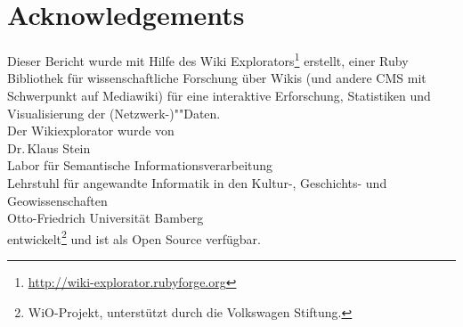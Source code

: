 \documentclass{scrartcl}
\begin{document}
\section*{Acknowledgements}
Dieser Bericht wurde mit Hilfe des Wiki Explorators\footnote{\protect\url{http://wiki-explorator.rubyforge.org}} erstellt, einer Ruby Bibliothek für wissenschaftliche Forschung über Wikis (und andere CMS mit Schwerpunkt auf Mediawiki) für eine interaktive Erforschung, Statistiken und Visualisierung der \mbox{(Netzwerk-)}""Daten.\\[2ex]
Der Wikiexplorator wurde von\\[2ex]
Dr.\,Klaus Stein\\
Labor für Semantische Informationsverarbeitung\\
Lehrstuhl für angewandte Informatik in den Kultur-, Geschichts- und Geowissenschaften\\
Otto-Friedrich Universität Bamberg\\[2ex]
entwickelt\footnote{WiO-Projekt, unterstützt durch
die Volkswagen Stiftung.} 
und ist als Open Source verfügbar.
\end{document}
